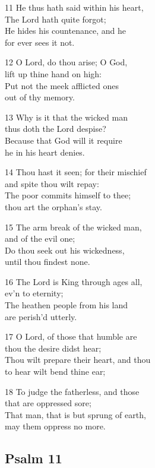 11 He thus hath said within his heart,\\
The Lord hath quite forgot;\\
He hides his countenance, and he\\
for ever sees it not.

12 O Lord, do thou arise; O God,\\
lift up thine hand on high:\\
Put not the meek afflicted ones\\
out of thy memory.

13 Why is it that the wicked man\\
thus doth the Lord despise?\\
Because that God will it require\\
he in his heart denies.

14 Thou hast it seen; for their mischief\\
and spite thou wilt repay:\\
The poor commits himself to thee;\\
thou art the orphan’s stay.

15 The arm break of the wicked man,\\
and of the evil one;\\
Do thou seek out his wickedness,\\
until thou findest none.

16 The Lord is King through ages all,\\
ev’n to eternity;\\
The heathen people from his land\\
are perish’d utterly.

17 O Lord, of those that humble are\\
thou the desire didst hear;\\
Thou wilt prepare their heart, and thou\\
to hear wilt bend thine ear;

18 To judge the fatherless, and those\\
that are oppressed sore;\\
That man, that is but sprung of earth,\\
may them oppress no more.


\begin{center}
\quad{}\quad{}
\end{center}

\subsection*{Psalm 11 }

